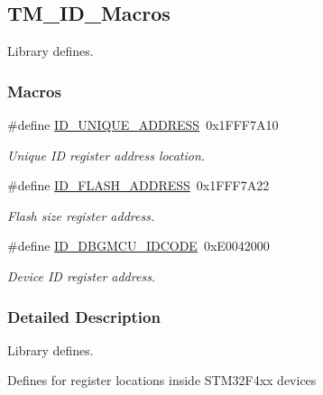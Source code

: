 \hypertarget{group___t_m___i_d___macros}{}\subsection{T\+M\+\_\+\+I\+D\+\_\+\+Macros}
\label{group___t_m___i_d___macros}


Library defines.  


\subsubsection*{Macros}
\begin{DoxyCompactItemize}
\item 
\hypertarget{group___t_m___i_d___macros_ga631ce0b70a16d3e71bb83d4ad88552c2}{}\#define \hyperlink{group___t_m___i_d___macros_ga631ce0b70a16d3e71bb83d4ad88552c2}{I\+D\+\_\+\+U\+N\+I\+Q\+U\+E\+\_\+\+A\+D\+D\+R\+E\+S\+S}~0x1\+F\+F\+F7\+A10\label{group___t_m___i_d___macros_ga631ce0b70a16d3e71bb83d4ad88552c2}

\begin{DoxyCompactList}\small\item\em Unique I\+D register address location. \end{DoxyCompactList}\item 
\hypertarget{group___t_m___i_d___macros_ga95fa471f6d9518cbf3228a2a6d69f5a7}{}\#define \hyperlink{group___t_m___i_d___macros_ga95fa471f6d9518cbf3228a2a6d69f5a7}{I\+D\+\_\+\+F\+L\+A\+S\+H\+\_\+\+A\+D\+D\+R\+E\+S\+S}~0x1\+F\+F\+F7\+A22\label{group___t_m___i_d___macros_ga95fa471f6d9518cbf3228a2a6d69f5a7}

\begin{DoxyCompactList}\small\item\em Flash size register address. \end{DoxyCompactList}\item 
\hypertarget{group___t_m___i_d___macros_gad1789f86a55e8fc3c2c486dacf3df1a6}{}\#define \hyperlink{group___t_m___i_d___macros_gad1789f86a55e8fc3c2c486dacf3df1a6}{I\+D\+\_\+\+D\+B\+G\+M\+C\+U\+\_\+\+I\+D\+C\+O\+D\+E}~0x\+E0042000\label{group___t_m___i_d___macros_gad1789f86a55e8fc3c2c486dacf3df1a6}

\begin{DoxyCompactList}\small\item\em Device I\+D register address. \end{DoxyCompactList}\end{DoxyCompactItemize}


\subsubsection{Detailed Description}
Library defines. 

Defines for register locations inside S\+T\+M32\+F4xx devices 
